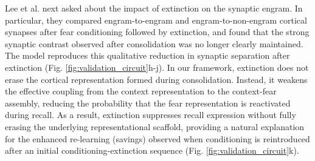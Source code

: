\documentclass{article}
\begin{document}
\newline\newline
Lee et al. \cite{lee_2023} next asked about the impact of extinction on the synaptic engram. In particular, they compared engram-to-engram and engram-to-non-engram cortical synapses after fear conditioning followed by extinction, and found that the strong synaptic contrast observed after consolidation was no longer clearly maintained. The model reproduces this qualitative reduction in synaptic separation after extinction (Fig. \ref{fig:validation_circuit}h-j). In our framework, extinction does not erase the cortical representation formed during consolidation. Instead, it weakens the effective coupling from the context representation to the context-fear assembly, reducing the probability that the fear representation is reactivated during recall. As a result, extinction suppresses recall expression without fully erasing the underlying representational scaffold, providing a natural explanation for the enhanced re-learning (savings) observed when conditioning is reintroduced after an initial conditioning-extinction sequence (Fig. \ref{fig:validation_circuit}k).
\end{document}

